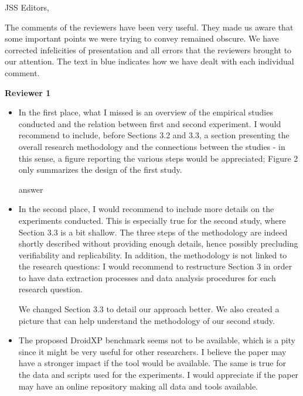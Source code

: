 \documentclass{letter}
\begin{document}
\begin{letter}{JSS Editors,}
\opening{The comments of the reviewers have been very useful. They made us aware that some important points we were trying to convey remained obscure. We have corrected infelicities of presentation and all errors that the reviewers brought to our attention. The text in {\color{blue}blue} indicates how we have dealt with each individual comment.}


{\bf Reviewer 1}

\begin{itemize}
\item In the first place, what I missed is an overview of the empirical studies conducted and the relation between 
first and second experiment. I would recommend to include, before Sections 3.2 and 3.3, a section 
presenting the overall research methodology and the connections between the studies - in this sense, 
a figure reporting the various steps would be appreciated; Figure 2 only summarizes the design of the first study.


\vspace{0.2cm}
  
{\color{blue}{\bf Answer.} answer}

\vspace{0.2cm}

\item In the second place, I would recommend to include more details on the experiments conducted. This is especially 
true for the second study, where Section 3.3 is a bit shallow. The three steps of the methodology are indeed shortly 
described without providing enough details, hence possibly precluding verifiability and replicability. In addition, the 
methodology is not linked to the research questions: I would recommend to restructure Section 3 in order to have 
data extraction processes and data analysis procedures for each research question.


\vspace{0.2cm}

{\color{blue}{\bf Answer.} We changed Section 3.3 to detail our approach better. We also created a picture that can help understand the methodology of our second study.}  

\vspace{0.2cm}

\item The proposed DroidXP benchmark seems not to be available, which is a pity since it might be very useful for other 
researchers. I believe the paper may have a stronger impact if the tool would be available. The same is true for the 
data and scripts used for the experiments. I would appreciate if the paper may have an online repository making all 
data and tools available.



\end{itemize}
\end{letter}
\end{document}
